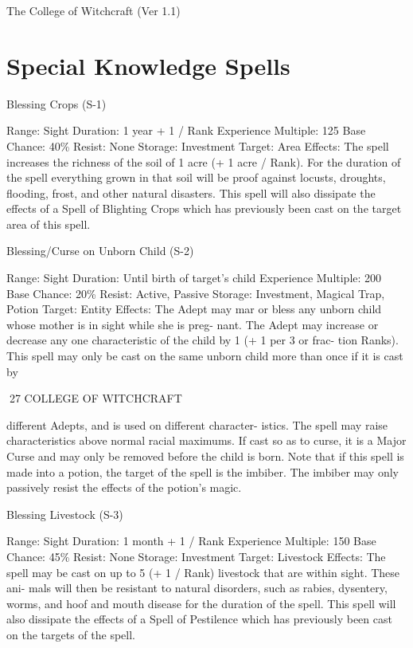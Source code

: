 \begin{Chapter}{The College of Witchcraft (Ver 1.1)}
\section{Special Knowledge Spells}

Blessing Crops (S-1) 

Range: Sight 
Duration: 1 year + 1 / Rank 
Experience Multiple: 125 
Base Chance: 40\% 
Resist: None 
Storage: Investment 
Target: Area 
Effects: The spell increases the richness of the soil 
of 1 acre (+ 1 acre / Rank). For the duration of the 
spell  everything  grown  in  that  soil  will  be  proof 
against locusts, droughts, flooding, frost, and other 
natural  disasters.  This  spell  will  also  dissipate  the 
effects  of  a  Spell  of  Blighting  Crops  which  has 
previously been cast on the target area of this spell. 

Blessing/Curse on Unborn Child (S-2) 

Range: Sight 
Duration: Until birth of target’s child 
Experience Multiple: 200 
Base Chance: 20\% 
Resist: Active, Passive 
Storage: Investment, Magical Trap, Potion 
Target: Entity 
Effects:  The  Adept  may  mar  or  bless  any  unborn 
child  whose  mother  is  in  sight  while  she  is  preg-
nant. The Adept may increase or decrease any one 
characteristic  of  the  child  by  1  (+  1  per  3  or  frac-
tion  Ranks).  This  spell  may  only  be  cast  on  the 
same  unborn  child  more  than  once  if  it  is  cast  by 

27 COLLEGE OF WITCHCRAFT 

different Adepts, and is used on different character-
istics.  The  spell  may  raise  characteristics  above 
normal racial maximums. If cast so as to curse, it is 
a Major Curse and may only be removed before the 
child is born. Note that if this spell is made into a 
potion,  the  target  of  the  spell  is  the  imbiber.  The 
imbiber may only passively resist the effects of the 
potion’s magic. 

Blessing Livestock (S-3) 

Range: Sight 
Duration: 1 month + 1 / Rank 
Experience Multiple: 150 
Base Chance: 45\% 
Resist: None 
Storage: Investment 
Target: Livestock 
Effects:  The  spell  may  be  cast  on  up  to  5  (+  1  / 
Rank)  livestock  that  are  within  sight.  These  ani-
mals  will  then  be  resistant  to  natural  disorders, 
such  as  rabies,  dysentery,  worms,  and  hoof  and 
mouth  disease  for  the  duration  of  the  spell.  This 
spell  will  also  dissipate  the  effects  of  a  Spell  of 
Pestilence  which  has  previously  been  cast  on  the 
targets of the spell. 


\end{Chapter}
